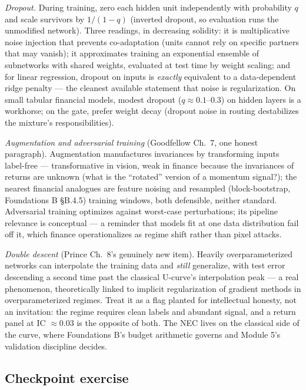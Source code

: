 \documentclass[11pt]{article}
\numberwithin{equation}{section}
\theoremstyle{plain}
\theoremstyle{definition}
\theoremstyle{remark}
\newcounter{exercise}
\begin{document}
\emph{Dropout.} During training, zero each hidden unit independently with probability $q$ and scale survivors by $1/(1-q)$ (inverted dropout, so evaluation runs the unmodified network). Three readings, in decreasing solidity: it is multiplicative noise injection that prevents co-adaptation (units cannot rely on specific partners that may vanish); it approximates training an exponential ensemble of subnetworks with shared weights, evaluated at test time by weight scaling; and for linear regression, dropout on inputs is \emph{exactly} equivalent to a data-dependent ridge penalty --- the cleanest available statement that noise is regularization. On small tabular financial models, modest dropout ($q \approx 0.1$--$0.3$) on hidden layers is a workhorse; on the gate, prefer weight decay (dropout noise in routing destabilizes the mixture's responsibilities).

\emph{Augmentation and adversarial training} (Goodfellow Ch.\ 7, one honest paragraph). Augmentation manufactures invariances by transforming inputs label-free --- transformative in vision, weak in finance because the invariances of returns are unknown (what is the ``rotated'' version of a momentum signal?); the nearest financial analogues are feature noising and resampled (block-bootstrap, Foundations B \S B.4.5) training windows, both defensible, neither standard. Adversarial training optimizes against worst-case perturbations; its pipeline relevance is conceptual --- a reminder that models fit at one data distribution fail off it, which finance operationalizes as regime shift rather than pixel attacks.

\emph{Double descent} (Prince Ch.\ 8's genuinely new item). Heavily overparameterized networks can interpolate the training data and \emph{still} generalize, with test error descending a second time past the classical U-curve's interpolation peak --- a real phenomenon, theoretically linked to implicit regularization of gradient methods in overparameterized regimes. Treat it as a flag planted for intellectual honesty, not an invitation: the regime requires clean labels and abundant signal, and a return panel at IC $\approx 0.03$ is the opposite of both. The NEC lives on the classical side of the curve, where Foundations B's budget arithmetic governs and Module 5's validation discipline decides.


\subsection*{Checkpoint exercise}
\end{document}
